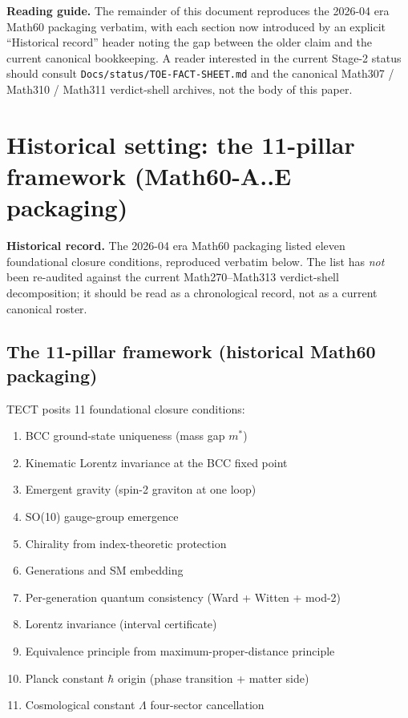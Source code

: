 \textbf{Reading guide.} The remainder of this document reproduces the
2026-04 era Math60 packaging verbatim, with each section now
introduced by an explicit ``Historical record'' header noting the
gap between the older claim and the current canonical bookkeeping.
A reader interested in the current Stage-2 status should consult
\texttt{Docs/status/TOE-FACT-SHEET.md} and the canonical Math307 /
Math310 / Math311 verdict-shell archives, not the body of this paper.

\section{Historical setting: the 11-pillar framework
(Math60-A..E packaging)}\label{sec:setting}

\textbf{Historical record.} The 2026-04 era Math60 packaging
listed eleven foundational closure conditions, reproduced verbatim
below. The list has \emph{not} been re-audited against the current
Math270--Math313 verdict-shell decomposition; it should be read as a
chronological record, not as a current canonical roster.

\subsection{The 11-pillar framework (historical Math60 packaging)}

TECT posits 11 foundational closure conditions:
\begin{enumerate}
\item BCC ground-state uniqueness (mass gap $m^*$)
\item Kinematic Lorentz invariance at the BCC fixed point
\item Emergent gravity (spin-2 graviton at one loop)
\item SO(10) gauge-group emergence
\item Chirality from index-theoretic protection
\item Generations and SM embedding
\item Per-generation quantum consistency (Ward + Witten + mod-2)
\item Lorentz invariance (interval certificate)
\item Equivalence principle from maximum-proper-distance principle
\item Planck constant $\hbar$ origin (phase transition + matter side)
\item Cosmological constant $\Lambda$ four-sector cancellation
\end{enumerate}

